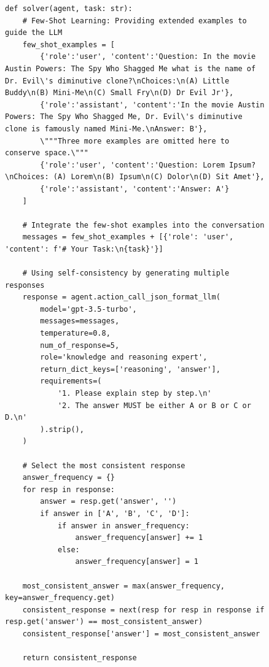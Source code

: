 \documentclass[11pt]{article}
\newcommand{\framework}{Gödel Agent\xspace}
\begin{document}
\newpage
\begin{figure}[ht]
\begin{lstlisting}[style=pythonstyle, caption={Code of the best policy found by \framework for MMLU.}]
def solver(agent, task: str):
    # Few-Shot Learning: Providing extended examples to guide the LLM
    few_shot_examples = [
        {'role':'user', 'content':'Question: In the movie Austin Powers: The Spy Who Shagged Me what is the name of Dr. Evil\'s diminutive clone?\nChoices:\n(A) Little Buddy\n(B) Mini-Me\n(C) Small Fry\n(D) Dr Evil Jr'},
        {'role':'assistant', 'content':'In the movie Austin Powers: The Spy Who Shagged Me, Dr. Evil\'s diminutive clone is famously named Mini-Me.\nAnswer: B'},
        \"""Three more examples are omitted here to conserve space.\"""
        {'role':'user', 'content':'Question: Lorem Ipsum?\nChoices: (A) Lorem\n(B) Ipsum\n(C) Dolor\n(D) Sit Amet'},
        {'role':'assistant', 'content':'Answer: A'}
    ]
    
    # Integrate the few-shot examples into the conversation
    messages = few_shot_examples + [{'role': 'user', 'content': f'# Your Task:\n{task}'}]
    
    # Using self-consistency by generating multiple responses
    response = agent.action_call_json_format_llm(
        model='gpt-3.5-turbo', 
        messages=messages, 
        temperature=0.8, 
        num_of_response=5,
        role='knowledge and reasoning expert', 
        return_dict_keys=['reasoning', 'answer'], 
        requirements=(
            '1. Please explain step by step.\n'
            '2. The answer MUST be either A or B or C or D.\n'
        ).strip(), 
    )
    
    # Select the most consistent response
    answer_frequency = {}
    for resp in response:
        answer = resp.get('answer', '')
        if answer in ['A', 'B', 'C', 'D']:
            if answer in answer_frequency:
                answer_frequency[answer] += 1
            else:
                answer_frequency[answer] = 1
    
    most_consistent_answer = max(answer_frequency, key=answer_frequency.get)
    consistent_response = next(resp for resp in response if resp.get('answer') == most_consistent_answer)
    consistent_response['answer'] = most_consistent_answer
    
    return consistent_response
\end{lstlisting}
\end{figure}
\newpage
\end{document}
